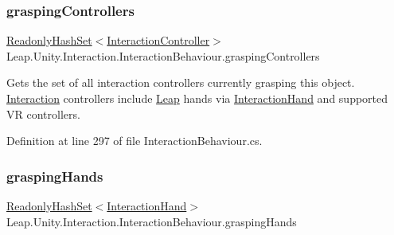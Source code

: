 \mbox{\label{class_leap_1_1_unity_1_1_interaction_1_1_interaction_behaviour_a4e52474da012bf38d096cbbacd73b3ec}} 
\subsubsection{\texorpdfstring{graspingControllers}{graspingControllers}}
{\footnotesize\ttfamily \mbox{\hyperlink{struct_leap_1_1_unity_1_1_readonly_hash_set}{Readonly\+Hash\+Set}}$<$\mbox{\hyperlink{class_leap_1_1_unity_1_1_interaction_1_1_interaction_controller}{Interaction\+Controller}}$>$ Leap.\+Unity.\+Interaction.\+Interaction\+Behaviour.\+grasping\+Controllers\hspace{0.3cm}{\ttfamily [get]}}



Gets the set of all interaction controllers currently grasping this object. \mbox{\hyperlink{namespace_leap_1_1_unity_1_1_interaction}{Interaction}} controllers include \mbox{\hyperlink{namespace_leap_1_1_unity_1_1_leap}{Leap}} hands via \mbox{\hyperlink{class_leap_1_1_unity_1_1_interaction_1_1_interaction_hand}{Interaction\+Hand}} and supported VR controllers. 



Definition at line 297 of file Interaction\+Behaviour.\+cs.

\mbox{\label{class_leap_1_1_unity_1_1_interaction_1_1_interaction_behaviour_a71688234e7a4bec485b5f79e3ca49098}} 
\subsubsection{\texorpdfstring{graspingHands}{graspingHands}}
{\footnotesize\ttfamily \mbox{\hyperlink{struct_leap_1_1_unity_1_1_readonly_hash_set}{Readonly\+Hash\+Set}}$<$\mbox{\hyperlink{class_leap_1_1_unity_1_1_interaction_1_1_interaction_hand}{Interaction\+Hand}}$>$ Leap.\+Unity.\+Interaction.\+Interaction\+Behaviour.\+grasping\+Hands\hspace{0.3cm}{\ttfamily [get]}}




